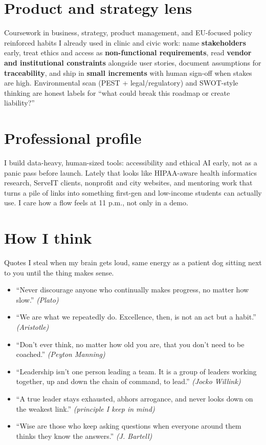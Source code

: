 \documentclass[11pt]{article}
\begin{document}
\section*{Product and strategy lens}
Coursework in business, strategy, product management, and EU-focused policy reinforced habits I already used in clinic and civic work: name \textbf{stakeholders} early, treat ethics and access as \textbf{non-functional requirements}, read \textbf{vendor and institutional constraints} alongside user stories, document assumptions for \textbf{traceability}, and ship in \textbf{small increments} with human sign-off when stakes are high. Environmental scan (PEST + legal/regulatory) and SWOT-style thinking are honest labels for ``what could break this roadmap or create liability?''

\section*{Professional profile}
I build data-heavy, human-sized tools: accessibility and ethical AI early, not as a panic pass before launch. Lately that looks like HIPAA-aware health informatics research, ServeIT clients, nonprofit and city websites, and mentoring work that turns a pile of links into something first-gen and low-income students can actually use. I care how a flow feels at 11 p.m., not only in a demo.

\section*{How I think}
Quotes I steal when my brain gets loud, same energy as a patient dog sitting next to you until the thing makes sense.

\begin{itemize}[leftmargin=*]
    \item ``Never discourage anyone who continually makes progress, no matter how slow.'' \textit{(Plato)}
    \item ``We are what we repeatedly do. Excellence, then, is not an act but a habit.'' \textit{(Aristotle)}
    \item ``Don't ever think, no matter how old you are, that you don't need to be coached.'' \textit{(Peyton Manning)}
    \item ``Leadership isn't one person leading a team. It is a group of leaders working together, up and down the chain of command, to lead.'' \textit{(Jocko Willink)}
    \item ``A true leader stays exhausted, abhors arrogance, and never looks down on the weakest link.'' \textit{(principle I keep in mind)}
    \item ``Wise are those who keep asking questions when everyone around them thinks they know the answers.'' \textit{(J. Bartell)}
\end{itemize}
\end{document}
